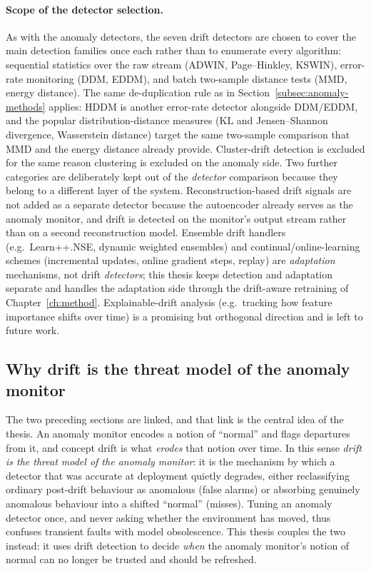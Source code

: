 \paragraph{Scope of the detector selection.}
As with the anomaly detectors, the seven drift detectors are chosen to cover the
main detection families once each rather than to enumerate every algorithm:
sequential statistics over the raw stream (ADWIN, Page--Hinkley, KSWIN),
error-rate monitoring (DDM, EDDM), and batch two-sample distance tests (MMD,
energy distance). The same de-duplication rule as in
Section~\ref{subsec:anomaly-methods} applies: HDDM is another error-rate
detector alongside DDM/EDDM, and
the popular distribution-distance measures (KL and Jensen--Shannon divergence,
Wasserstein distance) target the same two-sample comparison that MMD and the
energy distance already provide. Cluster-drift detection is excluded for the same
reason clustering is excluded on the anomaly side. Two further categories are
deliberately kept out of the \emph{detector} comparison because they belong to a
different layer of the system. Reconstruction-based drift signals are not added
as a separate detector because the autoencoder already serves as the anomaly
monitor, and drift is detected on the monitor's output stream rather than on a
second reconstruction model. Ensemble drift handlers (e.g.\ Learn++.NSE, dynamic
weighted ensembles) and continual/online-learning schemes (incremental updates,
online gradient steps, replay) are \emph{adaptation} mechanisms, not drift
\emph{detectors}; this thesis keeps detection and adaptation separate and handles
the adaptation side through the drift-aware retraining of
Chapter~\ref{ch:method}. Explainable-drift analysis (e.g.\ tracking how feature
importance shifts over time) is a promising but orthogonal direction and is left
to future work.

\subsection{Why drift is the threat model of the anomaly monitor}
\label{subsec:drift-anomaly-link}

The two preceding sections are linked, and that link is the central idea of the
thesis. An anomaly monitor encodes a notion of ``normal'' and flags departures
from it, and concept drift is what \emph{erodes} that notion over time. In this
sense \emph{drift is the threat model of the anomaly monitor}: it is the
mechanism by which a detector that was accurate at deployment quietly degrades,
either reclassifying ordinary post-drift behaviour as anomalous (false alarms) or
absorbing genuinely anomalous behaviour into a shifted ``normal'' (misses).
Tuning an anomaly detector once, and never asking whether the environment has
moved, thus confuses transient faults with model obsolescence. This thesis
couples the two instead: it uses drift detection to decide \emph{when} the
anomaly monitor's notion of normal can no longer be trusted and should be
refreshed.

